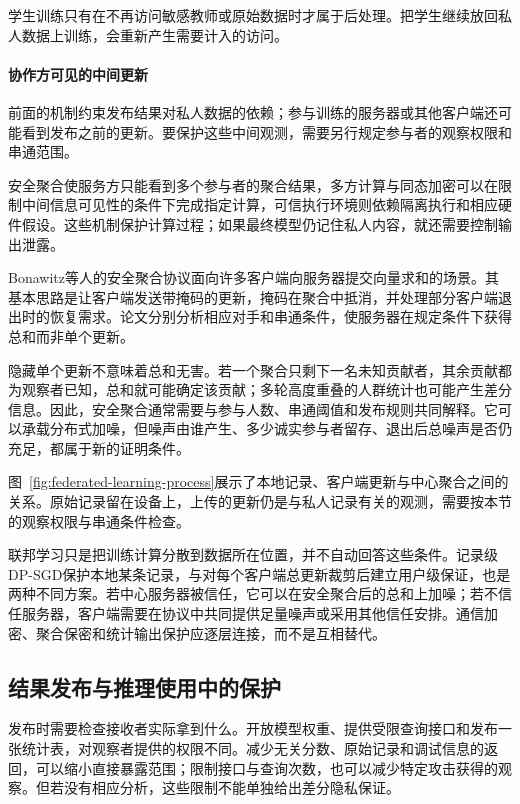 学生训练只有在不再访问敏感教师或原始数据时才属于后处理。把学生继续放回私人数据上训练，会重新产生需要计入的访问。

\paragraph{协作方可见的中间更新}

前面的机制约束发布结果对私人数据的依赖；参与训练的服务器或其他客户端还可能看到发布之前的更新。要保护这些中间观测，需要另行规定参与者的观察权限和串通范围。

安全聚合使服务方只能看到多个参与者的聚合结果，多方计算与同态加密可以在限制中间信息可见性的条件下完成指定计算，可信执行环境则依赖隔离执行和相应硬件假设。这些机制保护计算过程；如果最终模型仍记住私人内容，就还需要控制输出泄露。

Bonawitz等人的安全聚合协议面向许多客户端向服务器提交向量求和的场景。其基本思路是让客户端发送带掩码的更新，掩码在聚合中抵消，并处理部分客户端退出时的恢复需求。论文分别分析相应对手和串通条件，使服务器在规定条件下获得总和而非单个更新。

隐藏单个更新不意味着总和无害。若一个聚合只剩下一名未知贡献者，其余贡献都为观察者已知，总和就可能确定该贡献；多轮高度重叠的人群统计也可能产生差分信息。因此，安全聚合通常需要与参与人数、串通阈值和发布规则共同解释。它可以承载分布式加噪，但噪声由谁产生、多少诚实参与者留存、退出后总噪声是否仍充足，都属于新的证明条件。

图~\ref{fig:federated-learning-process}展示了本地记录、客户端更新与中心聚合之间的关系。原始记录留在设备上，上传的更新仍是与私人记录有关的观测，需要按本节的观察权限与串通条件检查。

联邦学习只是把训练计算分散到数据所在位置，并不自动回答这些条件。记录级DP-SGD保护本地某条记录，与对每个客户端总更新裁剪后建立用户级保证，也是两种不同方案。若中心服务器被信任，它可以在安全聚合后的总和上加噪；若不信任服务器，客户端需要在协议中共同提供足量噪声或采用其他信任安排。通信加密、聚合保密和统计输出保护应逐层连接，而不是互相替代。

\subsection{结果发布与推理使用中的保护}
\label{sec:privacy-statistical-release}
\label{sec:privacy-inference-context}
\label{sec:privacy-repeated-use}

发布时需要检查接收者实际拿到什么。开放模型权重、提供受限查询接口和发布一张统计表，对观察者提供的权限不同。减少无关分数、原始记录和调试信息的返回，可以缩小直接暴露范围；限制接口与查询次数，也可以减少特定攻击获得的观察。但若没有相应分析，这些限制不能单独给出差分隐私保证。

